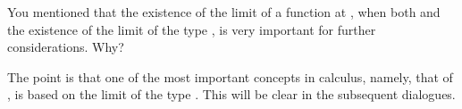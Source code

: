 \begin{s}
You mentioned that the existence of the limit of a function  at , when both  and  the existence of the limit of the type , is very important for further considerations. Why? 
\end{s}

\begin{p}
The point is that one of the most important concepts in calculus, namely, that of , is based on the limit of the type . This will be clear in the subsequent dialogues.
\end{p}







